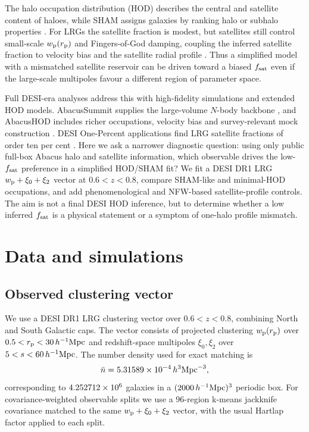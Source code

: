\documentclass[fleqn,usenatbib]{mnras}
\newcommand{\fsat}{f_{\rm sat}}
\newcommand{\wproj}{w_{\rm p}}
\newcommand{\xizero}{\xi_0}
\newcommand{\xitwo}{\xi_2}
\newcommand{\hmpc}{h^{-1}{\rm Mpc}}
\newcommand{\nbar}{\bar{n}}
\begin{document}
The halo occupation distribution (HOD) describes the central and satellite content of haloes, while SHAM assigns galaxies by ranking halo or subhalo properties \citep{PeacockSmith2000,Zheng2005,Conroy2006,Reddick2013}.  For LRGs the satellite fraction is modest, but satellites still control small-scale $\wproj(r_{\rm p})$ and Fingers-of-God damping, coupling the inferred satellite fraction to velocity bias and the satellite radial profile \citep{Tinker2007,Guo2015Velocity,Navarro1996}.  Thus a simplified model with a mismatched satellite reservoir can be driven toward a biased $\fsat$ even if the large-scale multipoles favour a different region of parameter space.

Full DESI-era analyses address this with high-fidelity simulations and extended HOD models.  AbacusSummit supplies the large-volume $N$-body backbone \citep{Maksimova2021}, and AbacusHOD includes richer occupations, velocity bias and survey-relevant mock construction \citep{Yuan2022}.  DESI One-Percent applications find LRG satellite fractions of order ten per cent \citep{Yuan2024}.  Here we ask a narrower diagnostic question: using only public full-box Abacus halo and satellite information, which observable drives the low-$\fsat$ preference in a simplified HOD/SHAM fit?  We fit a DESI DR1 LRG $\wproj+\xizero+\xitwo$ vector at $0.6<z<0.8$, compare SHAM-like and minimal-HOD occupations, and add phenomenological and NFW-based satellite-profile controls.  The aim is not a final DESI HOD inference, but to determine whether a low inferred $\fsat$ is a physical statement or a symptom of one-halo profile mismatch.

\section{Data and simulations}
\label{sec:data}

\subsection{Observed clustering vector}

We use a DESI DR1 LRG clustering vector over $0.6<z<0.8$, combining North and South Galactic caps.  The vector consists of projected clustering $\wproj(r_{\rm p})$ over $0.5<r_{\rm p}<30\,\hmpc$ and redshift-space multipoles $\xizero,\xitwo$ over $5<s<60\,\hmpc$.  The number density used for exact matching is
\begin{equation}
  \nbar = \ObservedNbar\,h^3{\rm Mpc}^{-3},
\end{equation}
corresponding to $4.252712\times10^{6}$ galaxies in a $(\BoxSize\,\hmpc)^3$ periodic box.  For covariance-weighted observable splits we use a 96-region k-means jackknife covariance matched to the same $\wproj+\xizero+\xitwo$ vector, with the usual Hartlap factor applied to each split.
\end{document}
